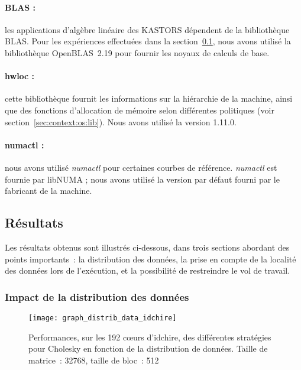 \paragraph{BLAS :} les applications d'algèbre linéaire des KASTORS dépendent de la bibliothèque BLAS.
Pour les expériences effectuées dans la section~\ref{sec:contribs:perf_eval:resultats}, nous avons utilisé la bibliothèque OpenBLAS~2.19 pour fournir les noyaux de calculs de base.


\paragraph{hwloc :} cette bibliothèque fournit les informations sur la hiérarchie de la machine, ainsi que des fonctions d'allocation de mémoire selon différentes politiques (voir section~\ref{sec:context:os:lib}). Nous avons utilisé la version 1.11.0.

\paragraph{numactl :} nous avons utilisé \emph{numactl} pour certaines courbes de référence. \emph{numactl} est fournie par libNUMA ; nous avons utilisé la version par défaut fourni par le fabricant de la machine.


\subsection{Résultats}\label{sec:contribs:perf_eval:resultats}

Les résultats obtenus sont illustrés ci-dessous, dans trois sections abordant des points importants~: la distribution des données, la prise en compte de la localité des données lors de l'exécution, et la possibilité de restreindre le vol de travail.

\subsubsection{Impact de la distribution des données}

\begin{figure}[ht]
  \centering
  \texttt{[image: graph\_distrib\_data\_idchire]}
  \caption{Performances, sur les 192 cœurs d'idchire, des différentes stratégies pour Cholesky en fonction de la distribution de données. Taille de matrice~: 32768, taille de bloc~: 512}\label{fig:contribs:perf_eval:distrib-idchire}
\end{figure}


